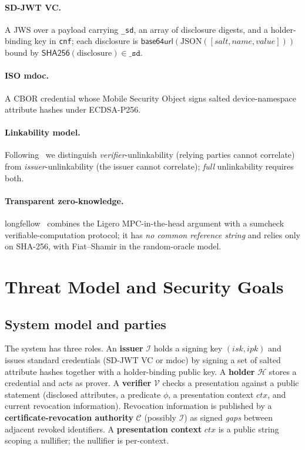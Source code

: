 \documentclass[11pt]{article}
\theoremstyle{plain}
\theoremstyle{definition}
\begin{document}
\paragraph{SD-JWT VC.} A JWS over a payload carrying \texttt{\_sd}, an array of
disclosure digests, and a holder-binding key in \texttt{cnf}; each disclosure is
$\mathsf{base64url}(\mathrm{JSON}([\mathit{salt},\mathit{name},\mathit{value}]))$ bound
by $\mathsf{SHA256}(\text{disclosure})\in\texttt{\_sd}$.

\paragraph{ISO mdoc.} A CBOR credential whose Mobile Security Object signs salted
device-namespace attribute hashes under ECDSA-P256.

\paragraph{Linkability model.} Following~\cite{etsi119476} we distinguish
\emph{verifier}-unlinkability (relying parties cannot correlate) from
\emph{issuer}-unlinkability (the issuer cannot correlate); \emph{full} unlinkability
requires both.

\paragraph{Transparent zero-knowledge.} longfellow~\cite{frigo2024longfellow,libzk-draft}
combines the Ligero MPC-in-the-head argument with a sumcheck verifiable-computation
protocol; it has \emph{no common reference string} and relies only on SHA-256, with
Fiat--Shamir in the random-oracle model.

\section{Threat Model and Security Goals}\label{sec:threat}

\subsection{System model and parties}
The system has three roles. An \textbf{issuer} $\mathcal{I}$ holds a signing key
$(\mathit{isk},\mathit{ipk})$ and issues standard credentials (SD-JWT VC or mdoc) by
signing a set of salted attribute hashes together with a holder-binding public key. A
\textbf{holder} $\mathcal{H}$ stores a credential and acts as prover. A
\textbf{verifier} $\mathcal{V}$ checks a presentation against a public statement
(disclosed attributes, a predicate $\phi$, a presentation context $\mathit{ctx}$, and
current revocation information). Revocation information is published by a
\textbf{certificate-revocation authority} $\mathcal{C}$ (possibly $\mathcal{I}$) as
signed \emph{gaps} between adjacent revoked identifiers. A \textbf{presentation
context} $\mathit{ctx}$ is a public string scoping a nullifier; the nullifier is
per-context.
\end{document}
